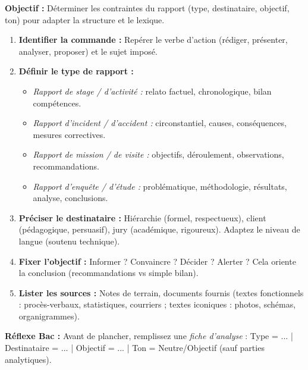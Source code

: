 \documentclass[11pt]{article}
\begin{document}
\begin{methode}
    \textbf{Objectif :} Déterminer les contraintes du rapport (type, destinataire, objectif, ton) pour adapter la structure et le lexique.
    \begin{enumerate}
        \item \textbf{Identifier la commande :} Repérer le verbe d'action (rédiger, présenter, analyser, proposer) et le sujet imposé.
        \item \textbf{Définir le type de rapport :}
            \begin{itemize}
                \item \emph{Rapport de stage / d'activité :} relato factuel, chronologique, bilan compétences.
                \item \emph{Rapport d'incident / d'accident :} circonstantiel, causes, conséquences, mesures correctives.
                \item \emph{Rapport de mission / de visite :} objectifs, déroulement, observations, recommandations.
                \item \emph{Rapport d'enquête / d'étude :} problématique, méthodologie, résultats, analyse, conclusions.
            \end{itemize}
        \item \textbf{Préciser le destinataire :} Hiérarchie (formel, respectueux), client (pédagogique, persuasif), jury (académique, rigoureux). Adaptez le niveau de langue (soutenu technique).
        \item \textbf{Fixer l'objectif :} Informer ? Convaincre ? Décider ? Alerter ? Cela oriente la conclusion (recommandations vs simple bilan).
        \item \textbf{Lister les sources :} Notes de terrain, documents fournis (textes fonctionnels : procès-verbaux, statistiques, courriers ; textes iconiques : photos, schémas, organigrammes).
    \end{enumerate}
    \textbf{Réflexe Bac :} Avant de plancher, remplissez une \emph{fiche d'analyse} : Type = ... | Destinataire = ... | Objectif = ... | Ton = Neutre/Objectif (sauf parties analytiques).
\end{methode}
\end{document}
